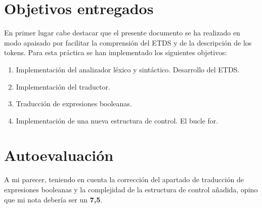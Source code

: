 \documentclass[12pt,a4paper,landscape]{article}
\theoremstyle{mytheor}
\begin{document}
\begin{titlepage}
  
  \vfill %
  
\end{titlepage}
\newpage
\tableofcontents
\newpage

\section{Objetivos entregados}
En primer lugar cabe destacar que el presente documento se ha realizado en modo apaisado por facilitar la comprensión del ETDS y de la descripción de los tokens.
Para esta práctica se han implementado los siguientes objetivos:
\begin{enumerate}
\item Implementación del analizador léxico y sintáctico. Desarrollo del ETDS.
\item Implementación del traductor.
\item Traducción de expresiones booleanas.
\item Implementación de una nueva estructura de control. El bucle for.
\end{enumerate}


\section{Autoevaluación}
A mi parecer, teniendo en cuenta la corrección del apartado de traducción de expresiones booleanas y la complejidad de la estructura de control añadida, opino que mi nota debería ser un \textbf{7,5}.

\newpage
\end{document}
